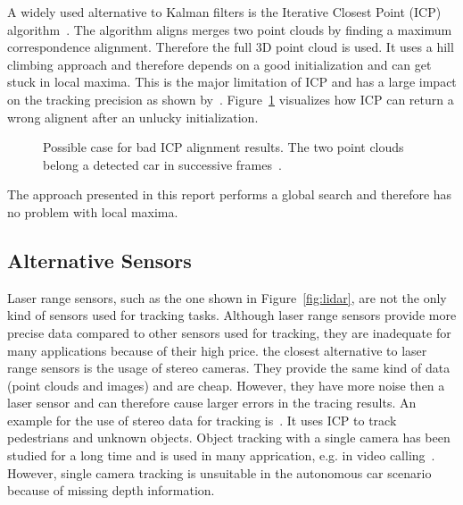 \documentclass[twoside,a4paper,article]{combine}
\begin{document}
A widely used alternative to Kalman filters is the Iterative Closest
Point (ICP) algorithm~\cite{icp, icp2}. The algorithm aligns merges
two point clouds by finding a maximum correspondence
alignment. Therefore the full 3D point cloud is used. It
uses a hill climbing approach and therefore depends on a good
initialization and can get stuck in local maxima. This is the major
limitation of ICP and has a large impact on the tracking precision as
shown by~\cite{icp-bad, icp-bad2}. Figure~\ref{fig:icp} visualizes how
ICP can return a wrong alignent after an unlucky initialization.
\begin{figure}
  \center
  
  \caption{Possible case for bad ICP alignment results. The two point
    clouds belong a detected car in successive frames~\cite{held-website}.}
  \label{fig:icp}
\end{figure}
The approach presented in this report performs a global search and
therefore has no problem with local maxima.

\subsection{Alternative Sensors}
\label{sub:slternative-sensors}
Laser range sensors, such as the one shown in Figure~\ref{fig:lidar},
are not the only kind of sensors used for tracking tasks. Although
laser range sensors provide more precise data compared to other
sensors used for tracking, they are inadequate
for many applications because of their high price. the closest
alternative to laser range sensors is the usage of stereo
cameras. They provide the same kind of data (point clouds and images)
and are cheap. However, they have more noise then a laser sensor and
can therefore cause larger errors in the tracing results. An example
for the use of stereo data for tracking
is~\cite{leibe-tracking-before-detection}. It uses ICP to track
pedestrians and unknown objects. Object tracking with a single camera
has been studied for a long time and is used in many apprication,
e.g. in video calling~\cite{single-camera-tracking}. However, single
camera tracking is unsuitable in the autonomous car scenario because
of missing depth information.
\end{document}
